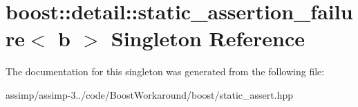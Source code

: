 \hypertarget{singletonboost_1_1detail_1_1static__assertion__failure}{\section{boost\+:\+:detail\+:\+:static\+\_\+assertion\+\_\+failure$<$ b $>$ Singleton Reference}
\label{singletonboost_1_1detail_1_1static__assertion__failure}
}


The documentation for this singleton was generated from the following file\+:\begin{DoxyCompactItemize}
\item 
assimp/assimp-\/3../code/\+Boost\+Workaround/boost/static\+\_\+assert.\+hpp\end{DoxyCompactItemize}
